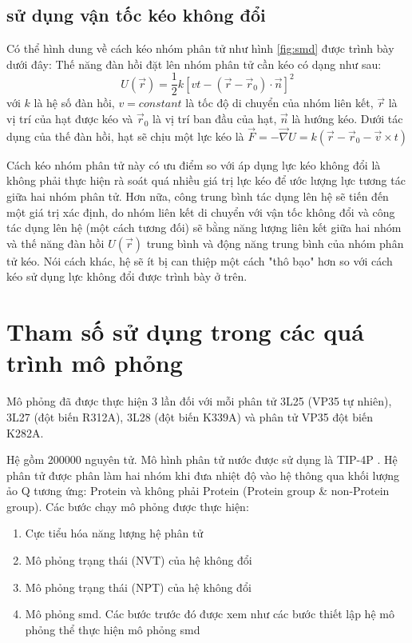 \documentclass[12pt,a4paper,reqno, oneside]{book}
\begin{document}
	\subsection{ sử dụng vận tốc kéo không đổi}
	Có thể hình dung về cách kéo nhóm phân tử như hình \ref{fig:smd} được trình bày dưới đây:
	Thế năng đàn hồi đặt lên nhóm phân tử cần kéo có dạng như sau:
	\begin{equation}
	U\left(\vec{r}\right) = \dfrac{1}{2} k\left[ vt - \left( \vec{r}-\vec{r}_{0} \right) \cdot\vec{n} \right]^{2}
	\end{equation}
	với $k$ là hệ số đàn hồi, $v=constant$ là tốc độ di chuyển của nhóm liên kết, $\vec{r}$ là vị trí của hạt được kéo và $\vec{r}_{0}$ là vị trí ban đầu của hạt, $\vec{n}$ là hướng kéo. Dưới tác dụng của thế đàn hồi, hạt sẽ chịu một lực kéo là $\vec{F} = -\vec{\nabla} U = k\left( \vec{r} - \vec{r}_{0} -\vec{v}\times t\right)$
	
	Cách kéo nhóm phân tử này có ưu điểm so với áp dụng lực kéo không đổi là không phải thực hiện rà soát quá nhiều giá trị lực kéo để ước lượng lực tương tác giữa hai nhóm phân tử. Hơn nữa, công trung bình tác dụng lên hệ sẽ tiến đến một giá trị xác định, do nhóm liên kết di chuyển với vận tốc không đổi và công tác dụng lên hệ (một cách tương đối) sẽ bằng năng lượng liên kết giữa hai nhóm và thế năng đàn hồi $U\left( \vec{r}\right) $ trung bình và động năng trung bình của nhóm phân tử kéo. Nói cách khác, hệ sẽ ít bị can thiệp một cách "thô bạo" hơn so với cách kéo sử dụng lực không đổi được trình bày ở trên.
\section{Tham số sử dụng trong các quá trình mô phỏng}
Mô phỏng đã được thực hiện 3 lần đối với mỗi phân tử 3L25 (VP35 tự nhiên), 3L27 (đột biến \gls{R312A}), 3L28 (đột biến \gls{K339A}) và phân tử VP35 đột biến \gls{K282A}.

Hệ gồm 200000 nguyên tử. Mô hình phân tử nước được sử dụng là TIP-4P \cite{Horn2004}. Hệ phân tử được phân làm hai nhóm khi đưa nhiệt độ vào hệ thông qua khối lượng ảo Q tương ứng: Protein và không phải Protein (Protein group \& non-Protein group).
Các bước chạy mô phỏng được thực hiện:
\begin{enumerate}
\item Cực tiểu hóa năng lượng hệ phân tử
\item Mô phỏng trạng thái (NVT) của hệ không đổi
\item Mô phỏng trạng thái (NPT) của hệ không đổi
\item Mô phỏng \gls{smd}. Các bước trước đó được xem như các bước thiết lập hệ mô phỏng thể thực hiện mô phỏng \gls{smd}
\end{enumerate}
\end{document}
